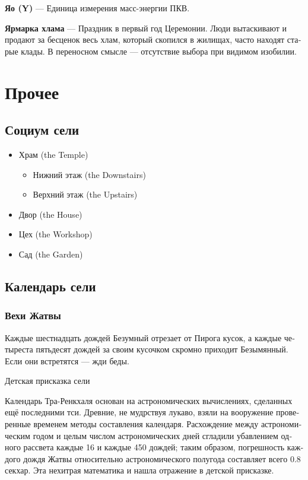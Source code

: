 \documentclass[a4paper,12pt,fleqn]{book}\usepackage{cooltooltips}\usepackage{polyglossia}\setdefaultlanguage[babelshorthands=true]{russian}\setotherlanguage{english}\defaultfontfeatures{Ligatures=TeX,Mapping=tex-text} \usepackage{xcolor}\definecolor{lightgray}{HTML}{bbbbbb}\color{lightgray}\newcommand{\ml}[3]{\textenglish{\textcolor{black}{#3}}}
\newcommand{\theterm}[3]{\textbf{\hypertarget{#1}{#2}} --- #3}
\begin{document}
{\theterm{yao}
{Яо (Y)}
{Единица измерения масс-энергии ПКВ.}

\theterm{rubbish-fair}
{Ярмарка хлама}
{Праздник в первый год Церемонии.
Люди вытаскивают и продают за бесценок весь хлам, который скопился в жилищах, часто находят старые клады.
В переносном смысле --- отсутствие выбора при видимом изобилии.}

\chapter{Прочее}

\section{Социум сели}

\begin{itemize}
\item Храм (the Temple)
\begin{itemize}
\item Нижний этаж (the Downstairs)
\item Верхний этаж (the Upstairs)
\end{itemize}
\item Двор (the House)
\item Цех (the Workshop)
\item Сад (the Garden)
\end{itemize}

\section{Календарь сели}

\subsection{Вехи Жатвы}

\epigraph
{Каждые шестнадцать дождей Безумный отрезает от Пирога кусок, а каждые четыреста пятьдесят дождей за своим кусочком скромно приходит Безымянный.
Если они встретятся --- жди беды.}
{Детская присказка сели}

Календарь Тра-Ренкхаля основан на астрономических вычислениях, сделанных ещё последними тси.
Древние, не мудрствуя лукаво, взяли на вооружение проверенные временем методы составления календаря.
Расхождение между астрономическим годом и целым числом астрономических дней сгладили убавлением одного рассвета каждые 16 и каждые 450 дождей;
таким образом, погрешность каждого дождя Жатвы относительно астрономического полугода составляет всего 0.8 секхар.
Эта нехитрая математика и нашла отражение в детской присказке.

}
\end{document}
